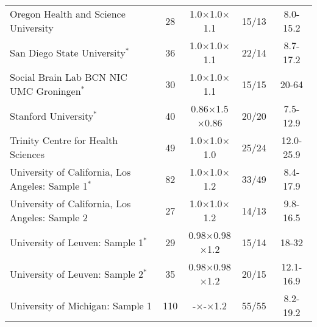 \documentclass[twoside,fleqn,espcrc2]{elsarticle}
\begin{document}
\begin{table}[htb!]
\begin{tabular}{lcccc}
\addlinespace
\parbox{4.8cm}{Oregon Health and
Science University} & 
\parbox{1.cm}{28} &
\parbox{1.7cm}{1.0$\times$1.0$\times$1.1}   &
\parbox{1.3cm}{15/13}    &
\parbox{1.5cm}{8.0-15.2}\\

\addlinespace
\parbox{4.8cm}{San Diego State University$^*$} & 
\parbox{1.cm}{36} &
\parbox{1.7cm}{1.0$\times$1.0$\times$1.1}   &
\parbox{1.3cm}{22/14}    &
\parbox{1.5cm}{8.7-17.2 }\\

\addlinespace
\parbox{4.8cm}{Social Brain Lab
BCN NIC UMC Groningen$^*$} & 
\parbox{1.cm}{30} &
\parbox{1.7cm}{1.0$\times$1.0$\times$1.1}   &
\parbox{1.3cm}{15/15}    &
\parbox{1.5cm}{20-64 }\\

\addlinespace
\parbox{4.8cm}{Stanford University$^*$} & 
\parbox{1.cm}{40} &
\parbox{1.7cm}{0.86$\times$1.5$\times$0.86}   &
\parbox{1.3cm}{20/20}    &
\parbox{1.5cm}{7.5-12.9 }\\

\addlinespace
\parbox{4.8cm}{Trinity Centre for Health Sciences} & 
\parbox{1.cm}{49} &
\parbox{1.7cm}{1.0$\times$1.0$\times$1.0}   &
\parbox{1.3cm}{25/24}    &
\parbox{1.5cm}{12.0-25.9 }\\

\addlinespace
\parbox{4.8cm}{University of California,
Los Angeles: Sample 1$^*$} & 
\parbox{1.cm}{82} &
\parbox{1.7cm}{1.0$\times$1.0$\times$1.2}   &
\parbox{1.3cm}{33/49}    &
\parbox{1.5cm}{8.4-17.9}\\

\addlinespace
\parbox{4.8cm}{University of California,
Los Angeles: Sample 2} & 
\parbox{1.cm}{27} &
\parbox{1.7cm}{1.0$\times$1.0$\times$1.2}   &
\parbox{1.3cm}{14/13}    &
\parbox{1.5cm}{9.8-16.5 }\\

\addlinespace
\parbox{4.8cm}{University of Leuven: Sample 1$^*$} & 
\parbox{1.cm}{29} &
\parbox{1.7cm}{0.98$\times$0.98$\times$1.2}   &
\parbox{1.3cm}{15/14}    &
\parbox{1.5cm}{18-32}\\

\addlinespace
\parbox{4.8cm}{University of Leuven: Sample 2$^*$} & 
\parbox{1.cm}{35} &
\parbox{1.7cm}{0.98$\times$0.98$\times$1.2}   &
\parbox{1.3cm}{20/15}    &
\parbox{1.5cm}{12.1-16.9}\\

\addlinespace
\parbox{4.8cm}{University of Michigan: Sample 1} & 
\parbox{1.cm}{110} &
\parbox{1.7cm}{-$\times$-$\times$1.2}   &
\parbox{1.3cm}{55/55}    &
\parbox{1.5cm}{8.2-19.2}\\


\end{tabular}
\end{table}
\end{document}
